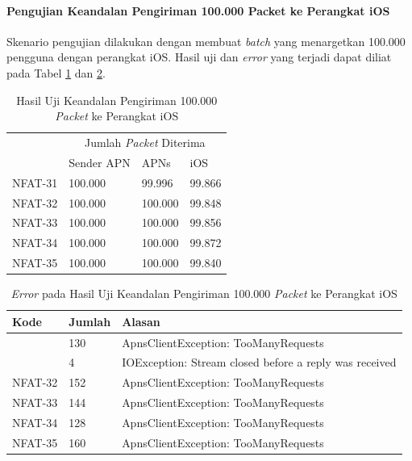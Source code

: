 \paragraph{Pengujian Keandalan Pengiriman 100.000 Packet ke Perangkat iOS}
\par Skenario pengujian dilakukan dengan membuat \textit{batch} yang menargetkan 100.000 pengguna dengan perangkat iOS. Hasil uji dan \textit{error} yang terjadi dapat diliat pada Tabel \ref{t:keandalan-ios-100k} dan \ref{t:error-keandalan-ios-100k}.
\begin{longtable}{|p{1.5cm}|p{2cm}|p{2cm}|p{2cm}|}
	\caption{Hasil Uji Keandalan Pengiriman 100.000 \textit{Packet} ke Perangkat iOS} \label{t:keandalan-ios-100k} \\ \hline
	\rowcolor{lightgray} & \multicolumn{3}{c|}{Jumlah \textit{Packet} Diterima} \\ \hhline{~|*3{-}|}
	\rowcolor{lightgray} \multirow{-2}{*}{Kode} & Sender APN & APNs & iOS \\ \hline
	\endhead
	NFAT-31 & 100.000 & 99.996 & 99.866 \\ \hline
	NFAT-32 & 100.000 & 100.000 & 99.848 \\ \hline
	NFAT-33 & 100.000 & 100.000 & 99.856 \\ \hline
	NFAT-34 & 100.000 & 100.000 & 99.872 \\ \hline
	NFAT-35 & 100.000 & 100.000 & 99.840 \\ \hline
\end{longtable}
\begin{longtable}{|p{1.5cm}|p{1.5cm}|p{4cm}|}
\caption{\textit{Error} pada Hasil Uji Keandalan Pengiriman 100.000 \textit{Packet} ke Perangkat iOS} \label{t:error-keandalan-ios-100k} \\ \hline
\rowcolor{lightgray} Kode & Jumlah & Alasan \\ \hline
 & 130 & ApnsClientException: TooManyRequests \\ \hhline{~|*2{-}|}
\multirow{-1}{*}{NFAT-31} & 4 & IOException: Stream closed before a reply was received \\ \hline
\endhead
NFAT-32 & 152 & ApnsClientException: TooManyRequests \\ \hline
NFAT-33 & 144 & ApnsClientException: TooManyRequests \\ \hline
NFAT-34 & 128 & ApnsClientException: TooManyRequests \\ \hline
NFAT-35 & 160 & ApnsClientException: TooManyRequests \\ \hline
\end{longtable}

